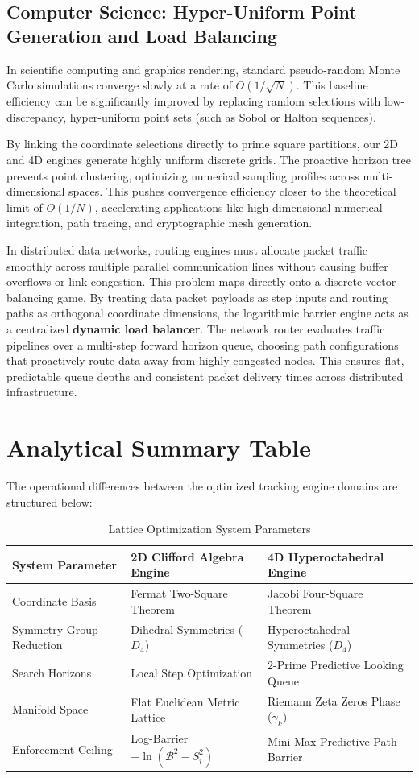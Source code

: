 \documentclass[11pt,a4paper]{article}
\begin{document}
\subsection{Computer Science: Hyper-Uniform Point Generation and Load Balancing}
In scientific computing and graphics rendering, standard pseudo-random Monte Carlo simulations converge slowly at a rate of $O(1/\sqrt{N})$. This baseline efficiency can be significantly improved by replacing random selections with low-discrepancy, hyper-uniform point sets (such as Sobol or Halton sequences). 

By linking the coordinate selections directly to prime square partitions, our 2D and 4D engines generate highly uniform discrete grids. The proactive horizon tree prevents point clustering, optimizing numerical sampling profiles across multi-dimensional spaces. This pushes convergence efficiency closer to the theoretical limit of $O(1/N)$, accelerating applications like high-dimensional numerical integration, path tracing, and cryptographic mesh generation.

In distributed data networks, routing engines must allocate packet traffic smoothly across multiple parallel communication lines without causing buffer overflows or link congestion. This problem maps directly onto a discrete vector-balancing game. By treating data packet payloads as step inputs and routing paths as orthogonal coordinate dimensions, the logarithmic barrier engine acts as a centralized \textbf{dynamic load balancer}. The network router evaluates traffic pipelines over a multi-step forward horizon queue, choosing path configurations that proactively route data away from highly congested nodes. This ensures flat, predictable queue depths and consistent packet delivery times across distributed infrastructure.

\section{Analytical Summary Table}
The operational differences between the optimized tracking engine domains are structured below:
\begin{table}[h]
\centering
\caption{Lattice Optimization System Parameters}
\vspace{2mm}
\begin{tabular}{lll}
\toprule
\textbf{System Parameter} & \textbf{2D Clifford Algebra Engine} & \textbf{4D Hyperoctahedral Engine} \\
\midrule
Coordinate Basis & Fermat Two-Square Theorem & Jacobi Four-Square Theorem \\
Symmetry Group Reduction & Dihedral Symmetries ($D_4$) & Hyperoctahedral Symmetries ($D_4$) \\
Search Horizons & Local Step Optimization & 2-Prime Predictive Looking Queue \\
Manifold Space & Flat Euclidean Metric Lattice & Riemann Zeta Zeros Phase ($\gamma_k$) \\
Enforcement Ceiling & Log-Barrier $-\ln(\mathcal{B}^2 - S_i^2)$ & Mini-Max Predictive Path Barrier \\
\bottomrule
\end{tabular}
\end{table}
\end{document}
